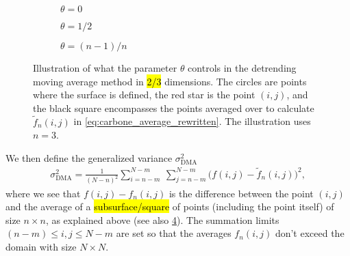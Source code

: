 \begin{figure}[htpb]%
    \centering%
    \begin{subfigure}[b]{0.25\textwidth}%
        \caption{$\theta = 0$}%
        \label{fig:DMA_theta_a}%
    \end{subfigure}%
    \hspace{0.1\textwidth}%
    \begin{subfigure}[b]{0.25\textwidth}%
        \caption{$\theta = 1/2$}%
        \label{fig:DMA_theta_b}%
    \end{subfigure}%
    \hspace{0.1\textwidth}%
    \begin{subfigure}[b]{0.25\textwidth}%
        \caption{$\theta = (n-1)/n$}%
        \label{fig:DMA_theta_c}%
    \end{subfigure}%
        \caption{%
        Illustration of what the parameter $\theta$ controls in the detrending moving average method in \hl{2/3} dimensions. The circles are points where the surface is defined, the red star is the point $(i,j)$, and the black square encompasses the points averaged over to calculate $\tilde f_n(i,j)$ in \cref{eq:carbone_average_rewritten}. The illustration uses $n = 3$.%
        \label{fig:DMA_theta}%
    }%
\end{figure}%

We then define the generalized variance $\sigma_\text{DMA}^2$
\begin{align}
    \sigma_\text{DMA}^2 
    = \frac{1}{(N-n)^2}\sum_{i=n-m}^{N-m} ~ \sum_{j=n-m}^{N-m} 
    \big(
        f(i,j) - \tilde f_n(i,j)
    \big)^2, \label{eq:dma_variance}
\end{align}
where we see that $f(i,j) - f_n(i,j)$ is the difference between the point $(i,j)$ and the average of a \hl{subsurface/square} of points (including the point itself) of size $n \times n$, as explained above (see also \cref{fig:DMA_theta}).
The summation limits $(n-m) \leq i,j \leq N-m$ are set so that the averages $f_n(i,j)$ don't exceed the domain with size $N \times N$.

